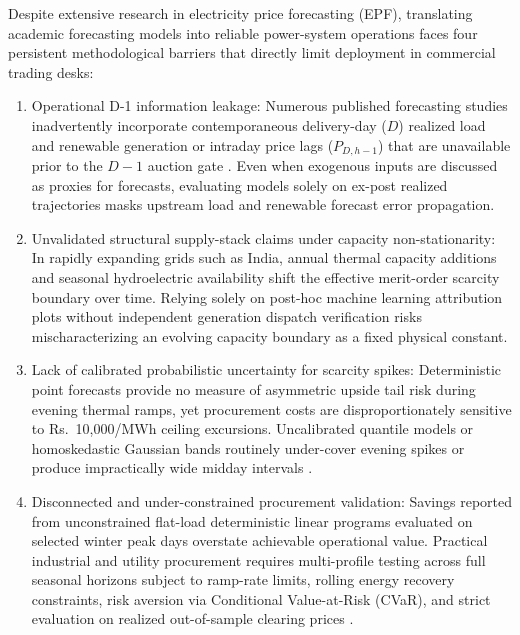 \documentclass[journal,10pt,twocolumn]{IEEEtran}
\begin{document}
Despite extensive research in electricity price forecasting (EPF), translating academic forecasting models into reliable power-system operations faces four persistent methodological barriers that directly limit deployment in commercial trading desks:
\begin{enumerate}
    \item Operational D-1 information leakage: Numerous published forecasting studies inadvertently incorporate contemporaneous delivery-day ($D$) realized load and renewable generation or intraday price lags ($P_{D,h-1}$) that are unavailable prior to the $D-1$ auction gate \cite{lago2021forecasting}. Even when exogenous inputs are discussed as proxies for forecasts, evaluating models solely on ex-post realized trajectories masks upstream load and renewable forecast error propagation.
    \item Unvalidated structural supply-stack claims under capacity non-stationarity: In rapidly expanding grids such as India, annual thermal capacity additions and seasonal hydroelectric availability shift the effective merit-order scarcity boundary over time. Relying solely on post-hoc machine learning attribution plots without independent generation dispatch verification risks mischaracterizing an evolving capacity boundary as a fixed physical constant.
    \item Lack of calibrated probabilistic uncertainty for scarcity spikes: Deterministic point forecasts provide no measure of asymmetric upside tail risk during evening thermal ramps, yet procurement costs are disproportionately sensitive to Rs.~10,000/MWh ceiling excursions. Uncalibrated quantile models or homoskedastic Gaussian bands routinely under-cover evening spikes or produce impractically wide midday intervals \cite{nowotarski2018recent,romano2019conformalized}.
    \item Disconnected and under-constrained procurement validation: Savings reported from unconstrained flat-load deterministic linear programs evaluated on selected winter peak days overstate achievable operational value. Practical industrial and utility procurement requires multi-profile testing across full seasonal horizons subject to ramp-rate limits, rolling energy recovery constraints, risk aversion via Conditional Value-at-Risk (CVaR), and strict evaluation on realized out-of-sample clearing prices \cite{conejo2010decision,rockafellar2000optimization}.
\end{enumerate}
\end{document}
